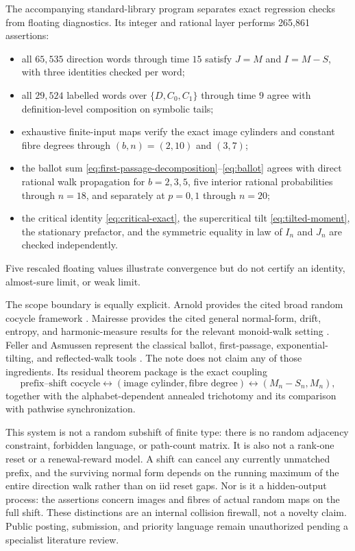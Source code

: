 \documentclass[11pt,a4paper]{amsart}
\theoremstyle{definition}
\theoremstyle{remark}
\begin{document}
The accompanying standard-library program separates exact regression
checks from floating diagnostics.  Its integer and rational layer performs
265,861 assertions:
\begin{itemize}
\item all $65{,}535$ direction words through time $15$ satisfy
      $J=M$ and $I=M-S$, with three identities checked per word;
\item all $29{,}524$ labelled words over $\{D,C_0,C_1\}$ through time $9$
      agree with definition-level composition on symbolic tails;
\item exhaustive finite-input maps verify the exact image cylinders and
      constant fibre degrees through $(b,n)=(2,10)$ and $(3,7)$;
\item the ballot sum \eqref{eq:first-passage-decomposition}--\eqref{eq:ballot}
      agrees with direct rational walk propagation for $b=2,3,5$, five
      interior rational probabilities through $n=18$, and separately at
      $p=0,1$ through $n=20$;
\item the critical identity \eqref{eq:critical-exact}, the supercritical
      tilt \eqref{eq:tilted-moment}, the stationary prefactor, and the
      symmetric equality in law of $I_n$ and $J_n$ are checked independently.
\end{itemize}
Five rescaled floating values illustrate convergence but do not certify an
identity, almost-sure limit, or weak limit.

The scope boundary is equally explicit.  Arnold provides the cited broad random
cocycle framework \cite{Arnold1998}.  Mairesse provides the cited general normal-form,
drift, entropy, and harmonic-measure results for the relevant monoid-walk
setting \cite{Mairesse2005}.  Feller and Asmussen represent the classical
ballot, first-passage, exponential-tilting, and reflected-walk tools
\cite{Feller1968,Asmussen2003}.  The note does not claim any of those
ingredients.  Its residual theorem package is the exact coupling
\[
 \text{prefix--shift cocycle}
 \longleftrightarrow
 (\text{image cylinder},\text{fibre degree})
 \longleftrightarrow
 (M_n-S_n,M_n),
\]
together with the alphabet-dependent annealed trichotomy and its comparison
with pathwise synchronization.

This system is not a random subshift of finite type: there is no random
adjacency constraint, forbidden language, or path-count matrix.  It is also
not a rank-one reset or a renewal-reward model.  A shift can cancel any
currently unmatched prefix, and the surviving normal form depends on the
running maximum of the entire direction walk rather than on iid reset gaps.
Nor is it a hidden-output process: the assertions concern images and fibres
of actual random maps on the full shift.  These distinctions are an internal
collision firewall, not a novelty claim.  Public posting, submission, and
priority language remain unauthorized pending a specialist literature
review.



\end{document}
